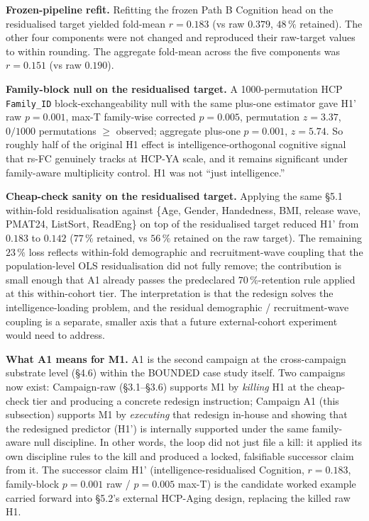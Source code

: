 \documentclass[11pt,letterpaper]{report}
\begin{document}
\textbf{Frozen-pipeline refit.} Refitting the frozen Path B Cognition head on the residualised target yielded fold-mean $r = 0.183$ (vs raw $0.379$, $48\,\%$ retained). The other four components were not changed and reproduced their raw-target values to within rounding. The aggregate fold-mean across the five components was $r = 0.151$ (vs raw $0.190$).

\textbf{Family-block null on the residualised target.} A 1000-permutation HCP \texttt{Family\_ID} block-exchangeability null with the same plus-one estimator gave H1' raw $p = 0.001$, max-T family-wise corrected $p = 0.005$, permutation $z = 3.37$, $0/1000$ permutations $\ge$ observed; aggregate plus-one $p = 0.001$, $z = 5.74$. So roughly half of the original H1 effect is intelligence-orthogonal cognitive signal that rs-FC genuinely tracks at HCP-YA scale, and it remains significant under family-aware multiplicity control. H1 was not ``just intelligence.''

\textbf{Cheap-check sanity on the residualised target.} Applying the same \S5.1 within-fold residualisation against \{Age, Gender, Handedness, BMI, release wave, PMAT24, ListSort, ReadEng\} on top of the residualised target reduced H1' from $0.183$ to $0.142$ ($77\,\%$ retained, vs $56\,\%$ retained on the raw target). The remaining $23\,\%$ loss reflects within-fold demographic and recruitment-wave coupling that the population-level OLS residualisation did not fully remove; the contribution is small enough that A1 already passes the predeclared $70\,\%$-retention rule applied at this within-cohort tier. The interpretation is that the redesign solves the intelligence-loading problem, and the residual demographic / recruitment-wave coupling is a separate, smaller axis that a future external-cohort experiment would need to address.

\textbf{What A1 means for M1.} A1 is the second campaign at the cross-campaign substrate level (\S4.6) within the BOUNDED case study itself. Two campaigns now exist: Campaign-raw (\S3.1--\S3.6) supports M1 by \emph{killing} H1 at the cheap-check tier and producing a concrete redesign instruction; Campaign A1 (this subsection) supports M1 by \emph{executing} that redesign in-house and showing that the redesigned predictor (H1') is internally supported under the same family-aware null discipline. In other words, the loop did not just file a kill: it applied its own discipline rules to the kill and produced a locked, falsifiable successor claim from it. The successor claim H1' (intelligence-residualised Cognition, $r = 0.183$, family-block $p = 0.001$ raw / $p = 0.005$ max-T) is the candidate worked example carried forward into \S5.2's external HCP-Aging design, replacing the killed raw H1.
\end{document}
